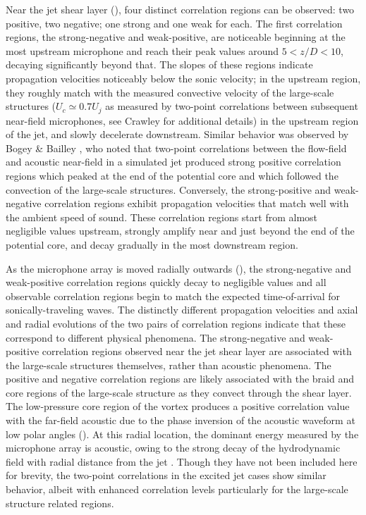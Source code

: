 Near the jet shear layer (), four distinct correlation regions can be observed: two positive, two negative; one strong and one weak for each. 
The first correlation regions, the strong-negative and weak-positive, are noticeable beginning at the most upstream microphone and reach their peak values around $5 < z/D < 10$, decaying significantly beyond that.
The slopes of these regions indicate propagation velocities noticeably below the sonic velocity; in the upstream region, they roughly match with the measured convective velocity of the large-scale structures ($U_c \simeq 0.7 U_j$ as measured by two-point correlations between subsequent near-field microphones, see Crawley \etal \citep{Crawley2015} for additional details) in the upstream region of the jet, and slowly decelerate downstream.
Similar behavior was observed by Bogey \& Bailley \citep{Bogey2007}, who noted that two-point correlations between the flow-field and acoustic near-field in a simulated jet produced strong positive correlation regions which peaked at the end of the potential core and which followed the convection of the large-scale structures.
Conversely, the strong-positive and weak-negative correlation regions exhibit propagation velocities that match well with the ambient speed of sound. 
These correlation regions start from almost negligible values upstream, strongly amplify near and just beyond the end of the potential core, and decay gradually in the most downstream region.

As the microphone array is moved radially outwards (), the strong-negative and weak-positive correlation regions quickly decay to negligible values and all observable correlation regions begin to match the expected time-of-arrival for sonically-traveling waves. 
The distinctly different propagation velocities and axial and radial evolutions of the two pairs of correlation regions indicate that these correspond to different physical phenomena.
The strong-negative and weak-positive correlation regions observed near the jet shear layer are associated with the large-scale structures themselves, rather than acoustic phenomena. 
The positive and negative correlation regions are likely associated with the braid and core regions of the large-scale structure as they convect through the shear layer. 
The low-pressure core region of the vortex produces a positive correlation value with the far-field acoustic due to the phase inversion of the acoustic waveform at low polar angles (). 
At this radial location, the dominant energy measured by the microphone array is acoustic, owing to the strong decay of the hydrodynamic field with radial distance from the jet \citep{Arndt1997}.
Though they have not been included here for brevity, the two-point correlations in the excited jet cases show similar behavior, albeit with enhanced correlation levels particularly for the large-scale structure related regions. 

